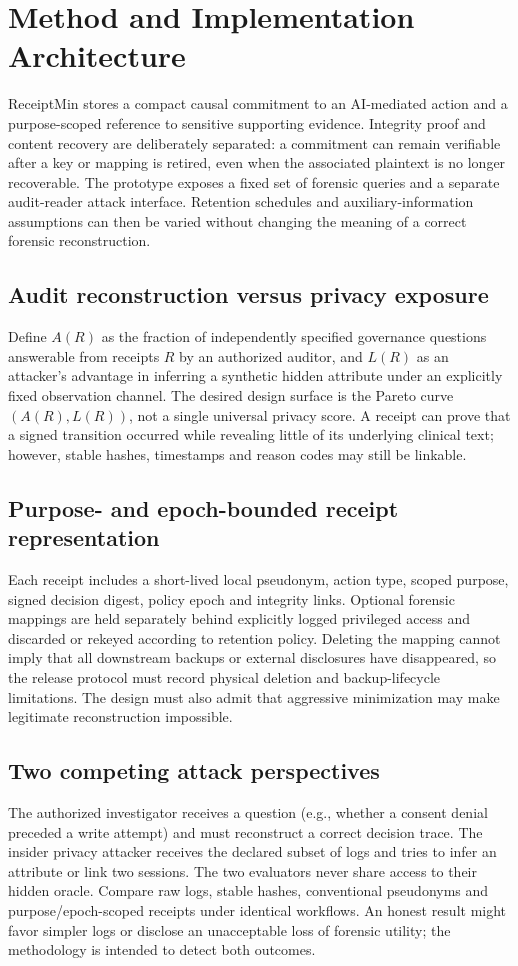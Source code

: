\documentclass[11pt,a4paper]{article}
\begin{document}
\section{Method and Implementation Architecture}
ReceiptMin stores a compact causal commitment to an AI-mediated action and a purpose-scoped reference to sensitive supporting evidence. Integrity proof and content recovery are deliberately separated: a commitment can remain verifiable after a key or mapping is retired, even when the associated plaintext is no longer recoverable. The prototype exposes a fixed set of forensic queries and a separate audit-reader attack interface. Retention schedules and auxiliary-information assumptions can then be varied without changing the meaning of a correct forensic reconstruction.

\subsection{Audit reconstruction versus privacy exposure}
Define $A(R)$ as the fraction of independently specified governance questions answerable from receipts $R$ by an authorized auditor, and $L(R)$ as an attacker's advantage in inferring a synthetic hidden attribute under an explicitly fixed observation channel. The desired design surface is the Pareto curve $(A(R),L(R))$, not a single universal privacy score. A receipt can prove that a signed transition occurred while revealing little of its underlying clinical text; however, stable hashes, timestamps and reason codes may still be linkable.

\subsection{Purpose- and epoch-bounded receipt representation}
Each receipt includes a short-lived local pseudonym, action type, scoped purpose, signed decision digest, policy epoch and integrity links. Optional forensic mappings are held separately behind explicitly logged privileged access and discarded or rekeyed according to retention policy. Deleting the mapping cannot imply that all downstream backups or external disclosures have disappeared, so the release protocol must record physical deletion and backup-lifecycle limitations. The design must also admit that aggressive minimization may make legitimate reconstruction impossible.

\subsection{Two competing attack perspectives}
The authorized investigator receives a question (e.g., whether a consent denial preceded a write attempt) and must reconstruct a correct decision trace. The insider privacy attacker receives the declared subset of logs and tries to infer an attribute or link two sessions. The two evaluators never share access to their hidden oracle. Compare raw logs, stable hashes, conventional pseudonyms and purpose/epoch-scoped receipts under identical workflows. An honest result might favor simpler logs or disclose an unacceptable loss of forensic utility; the methodology is intended to detect both outcomes.
\end{document}
